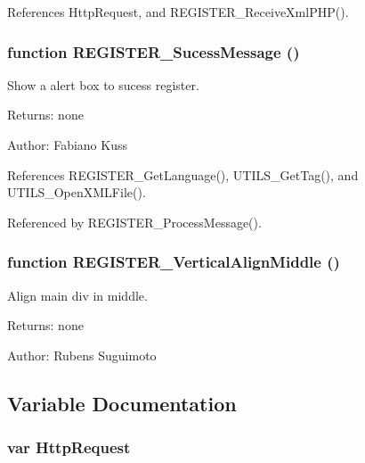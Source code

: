 References HttpRequest, and REGISTER\_\-ReceiveXmlPHP().
\subsubsection[REGISTER\_\-SucessMessage]{\setlength{\rightskip}{0pt plus 5cm}function REGISTER\_\-SucessMessage ()}\label{register_8js_f16ca40e345d5c80f16a10b57e8b5707}


Show a alert box to sucess register. 

\begin{Desc}
\item[Returns:]none \end{Desc}
\begin{Desc}
\item[Author:]Fabiano Kuss \end{Desc}


References REGISTER\_\-GetLanguage(), UTILS\_\-GetTag(), and UTILS\_\-OpenXMLFile().

Referenced by REGISTER\_\-ProcessMessage().
\subsubsection[REGISTER\_\-VerticalAlignMiddle]{\setlength{\rightskip}{0pt plus 5cm}function REGISTER\_\-VerticalAlignMiddle ()}\label{register_8js_4862cc46ed6cf1f2ec985a1339f0e0ef}


Align main div in middle. 

\begin{Desc}
\item[Returns:]none \end{Desc}
\begin{Desc}
\item[Author:]Rubens Suguimoto \end{Desc}


\subsection{Variable Documentation}
\subsubsection[HttpRequest]{\setlength{\rightskip}{0pt plus 5cm}var {\bf HttpRequest}}\label{register_8js_7766c35e097d0534a3567286da65c2d2}




